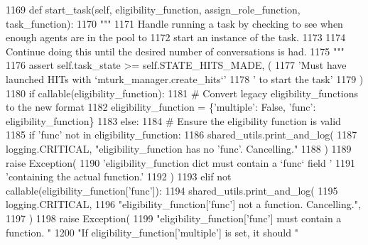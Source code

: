 \begin{DoxyCode}
1169     \textcolor{keyword}{def }start\_task(self, eligibility\_function, assign\_role\_function, task\_function):
1170         \textcolor{stringliteral}{"""}
1171 \textcolor{stringliteral}{        Handle running a task by checking to see when enough agents are in the pool to}
1172 \textcolor{stringliteral}{        start an instance of the task.}
1173 \textcolor{stringliteral}{}
1174 \textcolor{stringliteral}{        Continue doing this until the desired number of conversations is had.}
1175 \textcolor{stringliteral}{        """}
1176         \textcolor{keyword}{assert} self.task\_state >= self.STATE\_HITS\_MADE, (
1177             \textcolor{stringliteral}{'Must have launched HITs with `mturk\_manager.create\_hits`'}
1178             \textcolor{stringliteral}{' to start the task'}
1179         )
1180         \textcolor{keywordflow}{if} callable(eligibility\_function):
1181             \textcolor{comment}{# Convert legacy eligibility\_functions to the new format}
1182             eligibility\_function = \{\textcolor{stringliteral}{'multiple'}: \textcolor{keyword}{False}, \textcolor{stringliteral}{'func'}: eligibility\_function\}
1183         \textcolor{keywordflow}{else}:
1184             \textcolor{comment}{# Ensure the eligibility function is valid}
1185             \textcolor{keywordflow}{if} \textcolor{stringliteral}{'func'} \textcolor{keywordflow}{not} \textcolor{keywordflow}{in} eligibility\_function:
1186                 shared\_utils.print\_and\_log(
1187                     logging.CRITICAL, \textcolor{stringliteral}{"eligibility\_function has no 'func'. Cancelling."}
1188                 )
1189                 \textcolor{keywordflow}{raise} Exception(
1190                     \textcolor{stringliteral}{'eligibility\_function dict must contain a `func` field '}
1191                     \textcolor{stringliteral}{'containing the actual function.'}
1192                 )
1193             \textcolor{keywordflow}{elif} \textcolor{keywordflow}{not} callable(eligibility\_function[\textcolor{stringliteral}{'func'}]):
1194                 shared\_utils.print\_and\_log(
1195                     logging.CRITICAL,
1196                     \textcolor{stringliteral}{"eligibility\_function['func'] not a function. Cancelling."},
1197                 )
1198                 \textcolor{keywordflow}{raise} Exception(
1199                     \textcolor{stringliteral}{"eligibility\_function['func'] must contain a function. "}
1200                     \textcolor{stringliteral}{"If eligibility\_function['multiple'] is set, it should "}

\end{DoxyCode}
